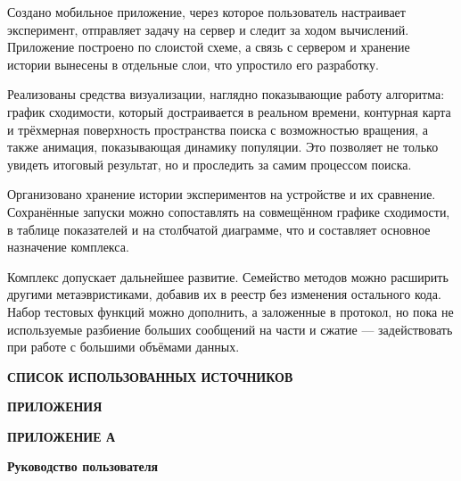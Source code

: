 \documentclass[14pt, a4paper]{extarticle}
\newcommand{\structelem}[1]{%
  \clearpage
  \phantomsection
  \addcontentsline{toc}{section}{#1}%
  \begin{center}\large\bfseries #1\end{center}
  \vspace{8pt}}
\begin{document}
Создано мобильное приложение, через которое пользователь настраивает эксперимент,
отправляет задачу на сервер и следит за ходом вычислений. Приложение построено по
слоистой схеме, а связь с сервером и хранение истории вынесены в отдельные слои,
что упростило его разработку.

Реализованы средства визуализации, наглядно показывающие работу алгоритма: график
сходимости, который достраивается в реальном времени, контурная карта и
трёхмерная поверхность пространства поиска с возможностью вращения, а также
анимация, показывающая динамику популяции. Это позволяет не только увидеть
итоговый результат, но и проследить за самим процессом поиска.

Организовано хранение истории экспериментов на устройстве и их сравнение.
Сохранённые запуски можно сопоставлять на совмещённом графике сходимости, в
таблице показателей и на столбчатой диаграмме, что и составляет основное
назначение комплекса.

Комплекс допускает дальнейшее развитие. Семейство методов можно расширить другими
метаэвристиками, добавив их в реестр без изменения остального кода. Набор тестовых
функций можно дополнить, а заложенные в протокол, но пока не используемые
разбиение больших сообщений на части и сжатие --- задействовать при работе с
большими объёмами данных. 

\clearpage
{}
{}
\begin{center}\large\bfseries СПИСОК ИСПОЛЬЗОВАННЫХ ИСТОЧНИКОВ\end{center}
\vspace{8pt}
\printbibliography[heading=none]

\structelem{ПРИЛОЖЕНИЯ}

\vspace{4pt}
\begin{center}\large\bfseries ПРИЛОЖЕНИЕ А\end{center}
\begin{center}\normalsize\bfseries Руководство пользователя\end{center}
\vspace{8pt}
\end{document}
